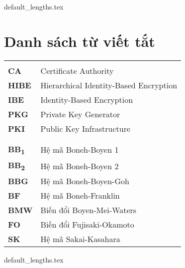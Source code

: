 \documentclass[class=report, crop=false]{standalone}
\begin{document}
	{default_lengths.tex}
	\baselineskip
	\chapter*{Danh sách từ viết tắt}
	\begin{tabu}{>{\large\bfseries}p{2cm} >{\large}X[l]}
		 \\
		CA						&	Certificate Authority										\\
		HIBE					&	Hierarchical Identity-Based Encryption 						\\
		IBE						&	Identity-Based Encryption 									\\
		PKG						&	Private Key Generator										\\
		PKI						&	Public Key Infrastructure									\\
		\\  \\
		BB\textsubscript{1}		& 	Hệ mã Boneh-Boyen 1 \cite{DBLP:journals/joc/BonehB11} 		\\
		BB\textsubscript{2}		& 	Hệ mã Boneh-Boyen 2 \cite{DBLP:journals/joc/BonehB11}		\\
		BBG						& 	Hệ mã Boneh-Boyen-Goh \cite{DBLP:conf/eurocrypt/BonehBG05} 	\\
		BF 						& 	Hệ mã Boneh-Franklin \cite{DBLP:conf/crypto/BonehF01} 		\\
		BMW 					& 	Biến đổi Boyen-Mei-Waters \cite{DBLP:conf/ccs/BoyenMW05} 	\\
		FO 						& 	Biến đổi Fujisaki-Okamoto \cite{DBLP:conf/crypto/FujisakiO99} 	\\
		SK 						& 	Hệ mã Sakai-Kasahara \cite{DBLP:journals/iacr/SakaiK03} 	\\
	\end{tabu}
	\newpage
	{default_lengths.tex}
\end{document}
